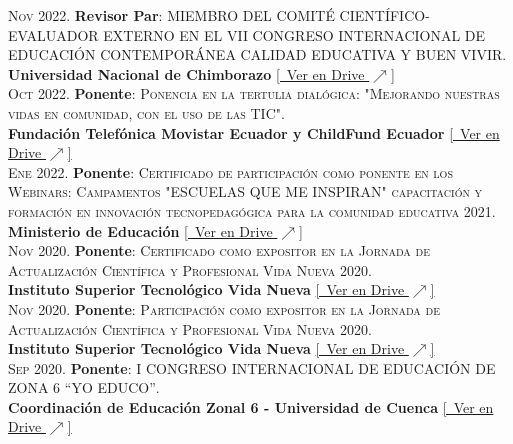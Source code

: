 \documentclass[a4paper]{article}
\begin{document}
\textsc{Nov} 2022. \textbf{Revisor Par}: \textsc{MIEMBRO DEL COMITÉ CIENTÍFICO-EVALUADOR EXTERNO EN EL VII CONGRESO INTERNACIONAL DE EDUCACIÓN CONTEMPORÁNEA CALIDAD EDUCATIVA Y BUEN VIVIR}.\\
\textbf{Universidad Nacional de Chimborazo} \small \href{https://drive.google.com/file/d/1z1I_ZYwcgPVJMLkgU5Sqrs4lF6zqJZH-/view}{[\faGoogleDrive~Ver en Drive $\nearrow$]} \\[4pt]

\textsc{Oct} 2022. \textbf{Ponente}: \textsc{Ponencia en la tertulia dialógica: "Mejorando nuestras vidas en comunidad, con el uso de las TIC"}.\\
\textbf{Fundación Telefónica Movistar Ecuador y ChildFund Ecuador} \small \href{https://drive.google.com/file/d/1DW020m3En9tBaYjc-Uh0KXe3Kzycqst8/view}{[\faGoogleDrive~Ver en Drive $\nearrow$]} \\[4pt]

\textsc{Ene} 2022. \textbf{Ponente}: \textsc{Certificado de participación como ponente en los Webinars: Campamentos "ESCUELAS QUE ME INSPIRAN" capacitación y formación en innovación tecnopedagógica para la comunidad educativa 2021}.\\
\textbf{Ministerio de Educación} \small \href{https://drive.google.com/file/d/1hrlULaAbyEygg7A_R-pDMfp5_PBRdsv_/view}{[\faGoogleDrive~Ver en Drive $\nearrow$]} \\[4pt]

\textsc{Nov} 2020. \textbf{Ponente}: \textsc{Certificado como expositor en la Jornada de Actualización Científica y Profesional Vida Nueva 2020}.\\
\textbf{Instituto Superior Tecnológico Vida Nueva} \small \href{https://drive.google.com/file/d/1G_LlZKRPKbMpnnc-2Z7Wy2h-m8ys7VuQ/view}{[\faGoogleDrive~Ver en Drive $\nearrow$]} \\[4pt]

\textsc{Nov} 2020. \textbf{Ponente}: \textsc{Participación como expositor en la Jornada de Actualización Científica y Profesional Vida Nueva 2020}.\\
\textbf{Instituto Superior Tecnológico Vida Nueva} \small \href{https://drive.google.com/file/d/13Gfbtz41YJ34fa1IJJ37JrK54IWjciI-/view}{[\faGoogleDrive~Ver en Drive $\nearrow$]} \\[4pt]

\textsc{Sep} 2020. \textbf{Ponente}: \textsc{I CONGRESO INTERNACIONAL DE EDUCACIÓN DE ZONA 6 “YO EDUCO”}.\\
\textbf{Coordinación de Educación Zonal 6 - Universidad de Cuenca} \small \href{https://drive.google.com/file/d/1mLu3NDe1qS1nDDlSXDO0DA229WV5hTU9/view}{[\faGoogleDrive~Ver en Drive $\nearrow$]} \\[4pt]
\end{document}
